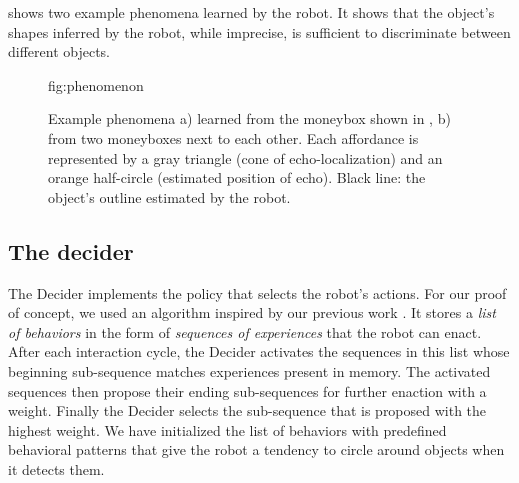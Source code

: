 \documentclass[pmlr]{jmlr}%
\begin{document}
 shows two example phenomena learned by the robot.  
It shows that the object's shapes inferred by the robot, while imprecise, is sufficient to discriminate between different objects.  


\begin{figure}[htbp]
	\floatconts
	{fig:phenomenon}
	{\caption{Example phenomena a) learned from the moneybox shown in , b) from two moneyboxes next to each other.
	Each affordance is represented by a gray triangle (cone of echo-localization) and an orange half-circle (estimated position of echo).
	Black line: the object's outline estimated by the robot.}}
	{
	\qquad
	}
\end{figure}



\subsection{The decider}
\label{sec:decider}

The Decider implements the policy that selects the robot's actions. 
For our proof of concept, we used an algorithm inspired by our previous work \citep{georgeon_eca_2013,robertson_biologically_2009}.
It stores a \textit{list of behaviors} in the form of \textit{sequences of experiences} that the robot can enact. 
After each interaction cycle, the Decider activates the sequences in this list whose beginning sub-sequence matches experiences present in memory. 
The activated sequences then propose their ending sub-sequences for further enaction with a weight. 
Finally the Decider selects the sub-sequence that is proposed with the highest weight. 
We have initialized the list of behaviors with predefined behavioral patterns that give the robot a tendency to circle around objects when it detects them. 
\end{document}
